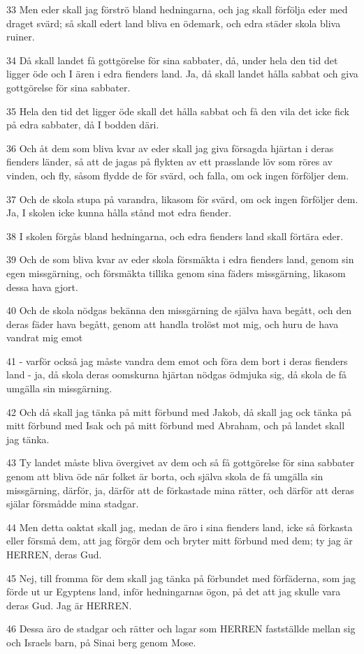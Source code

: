 \par 33 Men eder skall jag förströ bland hedningarna, och jag skall förfölja eder med draget svärd; så skall edert land bliva en ödemark, och edra städer skola bliva ruiner.
\par 34 Då skall landet få gottgörelse för sina sabbater, då, under hela den tid det ligger öde och I ären i edra fienders land. Ja, då skall landet hålla sabbat och giva gottgörelse för sina sabbater.
\par 35 Hela den tid det ligger öde skall det hålla sabbat och få den vila det icke fick på edra sabbater, då I bodden däri.
\par 36 Och åt dem som bliva kvar av eder skall jag giva försagda hjärtan i deras fienders länder, så att de jagas på flykten av ett prasslande löv som röres av vinden, och fly, såsom flydde de för svärd, och falla, om ock ingen förföljer dem.
\par 37 Och de skola stupa på varandra, likasom för svärd, om ock ingen förföljer dem. Ja, I skolen icke kunna hålla stånd mot edra fiender.
\par 38 I skolen förgås bland hedningarna, och edra fienders land skall förtära eder.
\par 39 Och de som bliva kvar av eder skola försmäkta i edra fienders land, genom sin egen missgärning, och försmäkta tillika genom sina fäders missgärning, likasom dessa hava gjort.
\par 40 Och de skola nödgas bekänna den missgärning de själva hava begått, och den deras fäder hava begått, genom att handla trolöst mot mig, och huru de hava vandrat mig emot
\par 41 - varför också jag måste vandra dem emot och föra dem bort i deras fienders land - ja, då skola deras oomskurna hjärtan nödgas ödmjuka sig, då skola de få umgälla sin missgärning.
\par 42 Och då skall jag tänka på mitt förbund med Jakob, då skall jag ock tänka på mitt förbund med Isak och på mitt förbund med Abraham, och på landet skall jag tänka.
\par 43 Ty landet måste bliva övergivet av dem och så få gottgörelse för sina sabbater genom att bliva öde när folket är borta, och själva skola de få umgälla sin missgärning, därför, ja, därför att de förkastade mina rätter, och därför att deras själar försmådde mina stadgar.
\par 44 Men detta oaktat skall jag, medan de äro i sina fienders land, icke så förkasta eller försmå dem, att jag förgör dem och bryter mitt förbund med dem; ty jag är HERREN, deras Gud.
\par 45 Nej, till fromma för dem skall jag tänka på förbundet med förfäderna, som jag förde ut ur Egyptens land, inför hedningarnas ögon, på det att jag skulle vara deras Gud. Jag är HERREN.
\par 46 Dessa äro de stadgar och rätter och lagar som HERREN fastställde mellan sig och Israels barn, på Sinai berg genom Mose.

